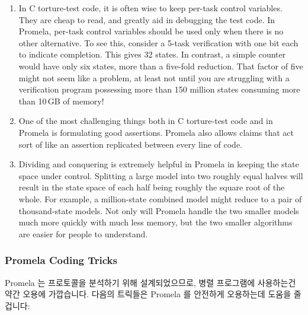 \begin{enumerate}
\item	In C torture-test code, it is often wise to keep per-task control
	variables.  They are cheap to read, and greatly aid in debugging the
	test code.  In Promela, per-task control variables should be used
	only when there is no other alternative.  To see this, consider
	a 5-task verification with one bit each to indicate completion.
	This gives 32 states.  In contrast, a simple counter would have
	only six states, more than a five-fold reduction.  That factor
	of five might not seem like a problem, at least not until you
	are struggling with a verification program possessing more than
	150 million states consuming more than 10\,GB of memory!
\item	One of the most challenging things both in C torture-test code and
	in Promela is formulating good assertions.  Promela also allows
	 claims that act sort of like an assertion replicated
	between every line of code.
\item	Dividing and conquering is extremely helpful in Promela in keeping
	the state space under control.  Splitting a large model into two
	roughly equal halves will result in the state space of each
	half being roughly the square root of the whole.
	For example, a million-state combined model might reduce to a
	pair of thousand-state models.
	Not only will Promela handle the two smaller models much more
	quickly with much less memory, but the two smaller algorithms
	are easier for people to understand.
\fi
\end{enumerate}


\subsubsection{Promela Coding Tricks}
\label{sec:formal:Promela Coding Tricks}

Promela 는 프로토콜을 분석하기 위해 설계되었으므로, 병렬 프로그램에 사용하는건
약간 오용에 가깝습니다.
다음의 트릭들은 Promela 를 안전하게 오용하는데 도움을 줄 겁니다:
\iffalse

Promela was designed to analyze protocols, so using it on parallel programs
is a bit abusive.
The following tricks can help you to abuse Promela safely:
\fi

